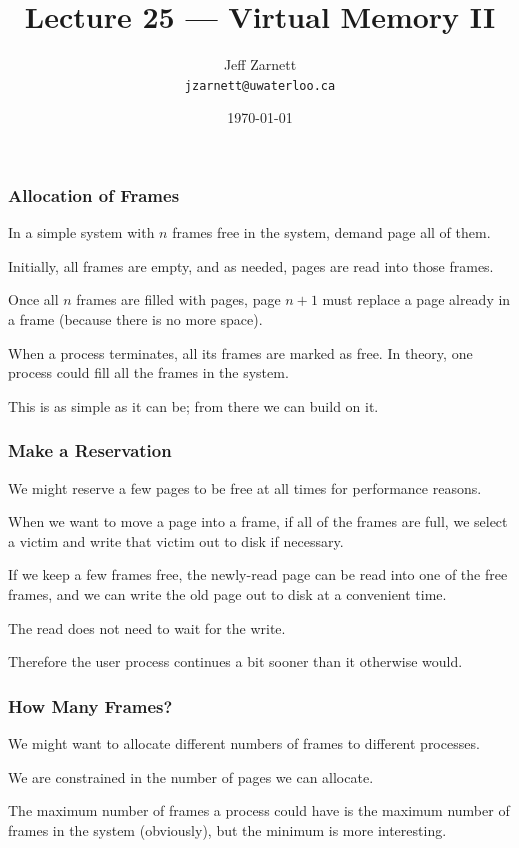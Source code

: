 

\title{Lecture 25 --- Virtual Memory II }

\author{Jeff Zarnett \\ \small \texttt{jzarnett@uwaterloo.ca}}
\date{\today}




\begin{frame}
  \titlepage

 \end{frame}


\begin{frame}
\frametitle{Allocation of Frames}

In a simple system with $n$ frames free in the system, demand page all of them. 

Initially, all frames are empty, and as needed, pages are read into those frames. 

Once all $n$ frames are filled with pages, page $n+1$ must replace a page already in a frame (because there is no more space). 

When a process terminates, all its frames are marked as free. In theory, one process could fill all the frames in the system. 

This is as simple as it can be; from there we can build on it.


\end{frame}

\begin{frame}
\frametitle{Make a Reservation}

We might reserve a few pages to be free at all times for performance reasons. 

When we want to move a page into a frame, if all of the frames are full, we select a victim and write that victim out to disk if necessary. 

If we keep a few frames free, the newly-read page can be read into one of the free frames, and we can write the old page out to disk at a convenient time. 

The read does not need to wait for the write.

Therefore the user process continues a bit sooner than it otherwise would.

\end{frame}

\begin{frame}
\frametitle{How Many Frames?}

We might want to allocate different numbers of frames to different processes.

We are constrained in the number of pages we can allocate. 

The maximum number of frames a process could have is the maximum number of frames in the system (obviously), but the minimum is more interesting.


\end{frame}

